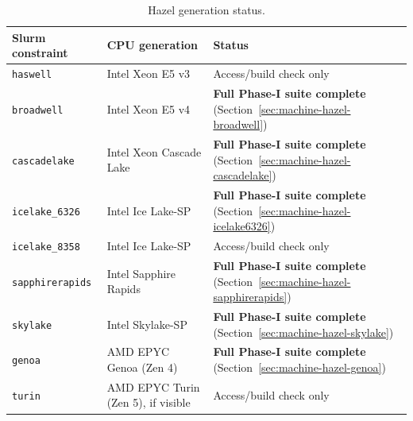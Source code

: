 \documentclass{article}
\begin{document}
\begin{table}[H]
\centering\small
\caption{Hazel generation status.}
\label{tab:hazel-generations}
\begin{tabular}{|l|l|l|}
\hline
Slurm constraint & CPU generation & Status\\
\hline
\texttt{haswell} & Intel Xeon E5 v3 & Access/build check only\\
\texttt{broadwell} & Intel Xeon E5 v4 & \textbf{Full Phase-I suite complete} (Section~\ref{sec:machine-hazel-broadwell})\\
\texttt{cascadelake} & Intel Xeon Cascade Lake & \textbf{Full Phase-I suite complete} (Section~\ref{sec:machine-hazel-cascadelake})\\
\texttt{icelake\_6326} & Intel Ice Lake-SP & \textbf{Full Phase-I suite complete} (Section~\ref{sec:machine-hazel-icelake6326})\\
\texttt{icelake\_8358} & Intel Ice Lake-SP & Access/build check only\\
\texttt{sapphirerapids} & Intel Sapphire Rapids & \textbf{Full Phase-I suite complete} (Section~\ref{sec:machine-hazel-sapphirerapids})\\
\texttt{skylake} & Intel Skylake-SP & \textbf{Full Phase-I suite complete} (Section~\ref{sec:machine-hazel-skylake})\\
\texttt{genoa} & AMD EPYC Genoa (Zen 4) & \textbf{Full Phase-I suite complete} (Section~\ref{sec:machine-hazel-genoa})\\
\texttt{turin} & AMD EPYC Turin (Zen 5), if visible & Access/build check only\\
\hline
\end{tabular}
\end{table}
\end{document}
